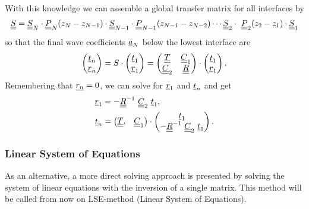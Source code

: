 With this knowledge we can assemble a global transfer matrix for all interfaces
by
\begin{equation} \label{eq:Scomposition}
    \underline{\underline{S}} = \underline{\underline{S}}_N\cdot \underline{\underline{P}}_{N}(z_{N}-z_{N-1})\cdot
    \underline{\underline{S}}_{N-1} \cdot \underline{\underline{P}}_{N-1}(z_{N-1}-z_{N-2}) \cdots
    \underline{\underline{S}}_2
    \cdot \ \underline{\underline{P}}_2(z_{2}-z_{1}) \cdot \underline{\underline{S}}_1
\end{equation}
so that the final wave coefficients $\underline{a}_N$ below the lowest interface
are
\begin{equation}
    \begin{pmatrix} \underline{t}_n \\ \underline{r}_n	\end{pmatrix}
    = S\cdot  \begin{pmatrix} \underline{t}_1 \\ \underline{r}_1 \end{pmatrix} =
    \begin{pmatrix}
        \underline{\underline{T}} & \underline{\underline{C}}_1 \\ \underline{\underline{C}}_2 & \underline{\underline{R}}
    \end{pmatrix} \cdot \begin{pmatrix} \underline{t}_1 \\ \underline{r}_1
    \end{pmatrix}.
\end{equation}
Remembering that $\underline{r_n}=0$, we can solve for $\underline{r}_1$ and
$\underline{t}_n$ and get
\begin{align} \label{eq:TMMcoeffsr}
    \uline{r}_1 & = -\uuline{R}^{-1}\ \uuline{C}_2\ \uline{t}_1     ,        \\
    \uline{t}_n & = \begin{pmatrix} \uuline{T},& \uuline{C}_1 \end{pmatrix}
    \cdot \begin{pmatrix} \uline{t}_1 \\ -\uuline{R}^{-1}\ \uuline{C}_2\
              \uline{t}_1\end{pmatrix} \label{eq:TMMcoeffst}.
\end{align}

\subsubsection{Linear System of Equations}
As an alternative, a more direct solving approach is presented by solving the
system of linear equations with the inversion of a single matrix. This method
will be called from now on LSE-method (Linear System of Equations).

